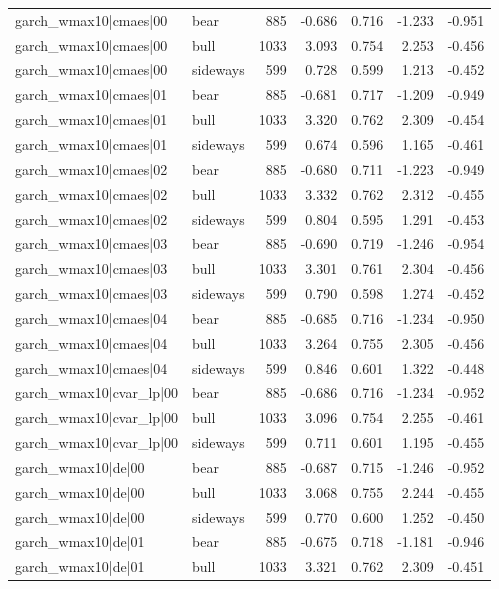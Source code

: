 \begin{table}
\begin{tabular}{llrrrrr}
garch\_wmax10|cmaes|00 & bear & 885 & -0.686 & 0.716 & -1.233 & -0.951 \\
garch\_wmax10|cmaes|00 & bull & 1033 & 3.093 & 0.754 & 2.253 & -0.456 \\
garch\_wmax10|cmaes|00 & sideways & 599 & 0.728 & 0.599 & 1.213 & -0.452 \\
garch\_wmax10|cmaes|01 & bear & 885 & -0.681 & 0.717 & -1.209 & -0.949 \\
garch\_wmax10|cmaes|01 & bull & 1033 & 3.320 & 0.762 & 2.309 & -0.454 \\
garch\_wmax10|cmaes|01 & sideways & 599 & 0.674 & 0.596 & 1.165 & -0.461 \\
garch\_wmax10|cmaes|02 & bear & 885 & -0.680 & 0.711 & -1.223 & -0.949 \\
garch\_wmax10|cmaes|02 & bull & 1033 & 3.332 & 0.762 & 2.312 & -0.455 \\
garch\_wmax10|cmaes|02 & sideways & 599 & 0.804 & 0.595 & 1.291 & -0.453 \\
garch\_wmax10|cmaes|03 & bear & 885 & -0.690 & 0.719 & -1.246 & -0.954 \\
garch\_wmax10|cmaes|03 & bull & 1033 & 3.301 & 0.761 & 2.304 & -0.456 \\
garch\_wmax10|cmaes|03 & sideways & 599 & 0.790 & 0.598 & 1.274 & -0.452 \\
garch\_wmax10|cmaes|04 & bear & 885 & -0.685 & 0.716 & -1.234 & -0.950 \\
garch\_wmax10|cmaes|04 & bull & 1033 & 3.264 & 0.755 & 2.305 & -0.456 \\
garch\_wmax10|cmaes|04 & sideways & 599 & 0.846 & 0.601 & 1.322 & -0.448 \\
garch\_wmax10|cvar\_lp|00 & bear & 885 & -0.686 & 0.716 & -1.234 & -0.952 \\
garch\_wmax10|cvar\_lp|00 & bull & 1033 & 3.096 & 0.754 & 2.255 & -0.461 \\
garch\_wmax10|cvar\_lp|00 & sideways & 599 & 0.711 & 0.601 & 1.195 & -0.455 \\
garch\_wmax10|de|00 & bear & 885 & -0.687 & 0.715 & -1.246 & -0.952 \\
garch\_wmax10|de|00 & bull & 1033 & 3.068 & 0.755 & 2.244 & -0.455 \\
garch\_wmax10|de|00 & sideways & 599 & 0.770 & 0.600 & 1.252 & -0.450 \\
garch\_wmax10|de|01 & bear & 885 & -0.675 & 0.718 & -1.181 & -0.946 \\
garch\_wmax10|de|01 & bull & 1033 & 3.321 & 0.762 & 2.309 & -0.451 \\

\end{tabular}
\end{table}
